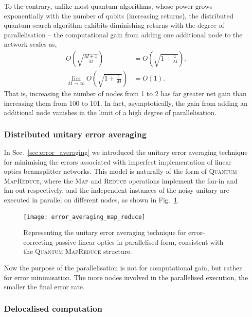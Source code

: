To the contrary, unlike most quantum algorithms, whose power grows exponentially with the number of qubits (increasing returns), the distributed quantum search algorithm exhibits diminishing returns with the degree of parallelisation -- the computational gain from adding one additional node to the network scales as,
\begin{align}
O\left(\sqrt{\frac{M+1}{M}}\right) &= O\left(\sqrt{1+\frac{1}{M}}\right),\nonumber\\
\lim_{M\to\infty} O\left(\sqrt{1+\frac{1}{M}}\right) &= O(1).
\end{align}
That is, increasing the number of nodes from 1 to 2 has far greater net gain than increasing them from 100 to 101. In fact, asymptotically, the gain from adding an additional node vanishes in the limit of a high degree of parallelisation.


\subsubsection{Distributed unitary error averaging}\label{sec:error_av_parallel}

In Sec.~\ref{sec:error_averaging} we introduced the unitary error averaging technique for minimising the errors associated with imperfect implementation of linear optics beamsplitter networks. This model is naturally of the form of \textsc{Quantum MapReduce}, where the \textsc{Map} and \textsc{Reduce} operations implement the fan-in and fan-out respectively, and the independent instances of the noisy unitary are executed in parallel on different nodes, as shown in Fig.~\ref{fig:error_av_map_reduce}.

\begin{figure}[!htb]
	\texttt{[image: error\_averaging\_map\_reduce]}
	\captionspacefig \caption{Representing the unitary error averaging technique for error-correcting passive linear optics in parallelised form, consistent with the \textsc{Quantum MapReduce} structure.}\label{fig:error_av_map_reduce}
\end{figure}

Now the purpose of the parallelisation is not for computational gain, but rather for error minimisation. The more nodes involved in the parallelised execution, the smaller the final error rate.

\subsubsection{Delocalised computation}

